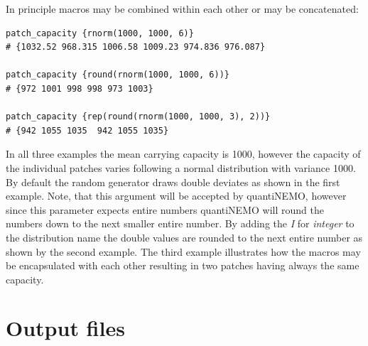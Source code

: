 \documentclass[letterpaper,12pt,oneside]{book}
\begin{document}
In principle macros may be combined within each other or may be concatenated:
\begin{lstlisting}[frame=single]
patch_capacity {rnorm(1000, 1000, 6)}
# {1032.52 968.315 1006.58 1009.23 974.836 976.087}

patch_capacity {round(rnorm(1000, 1000, 6))}
# {972 1001 998 998 973 1003}

patch_capacity {rep(round(rnorm(1000, 1000, 3), 2))}
# {942 1055 1035  942 1055 1035}
\end{lstlisting}
In all three examples the mean carrying capacity is 1000, however the capacity of the individual patches varies following a normal distribution with variance 1000. By default the random generator draws double deviates as shown in the first example. Note, that this argument will be accepted by quantiNEMO, however since this parameter expects entire numbers quantiNEMO will round the numbers down to the next smaller entire number. By adding the \textit{I} for \textit{integer} to the distribution name the double values are rounded to the next entire number as shown by the second example. The third example illustrates how the macros may be encapsulated with each other resulting in two patches having always the same capacity.


\section{Output files}\label{output}
\end{document}
